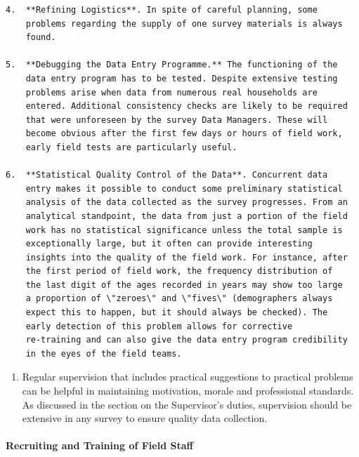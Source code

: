 \documentclass[
]{article}
\providecommand{\tightlist}{%
  \setlength{\itemsep}{0pt}\setlength{\parskip}{0pt}}
\begin{document}
\begin{verbatim}
4.  **Refining Logistics**. In spite of careful planning, some
    problems regarding the supply of one survey materials is always
    found.

5.  **Debugging the Data Entry Programme.** The functioning of the
    data entry program has to be tested. Despite extensive testing
    problems arise when data from numerous real households are
    entered. Additional consistency checks are likely to be required
    that were unforeseen by the survey Data Managers. These will
    become obvious after the first few days or hours of field work,
    early field tests are particularly useful.

6.  **Statistical Quality Control of the Data**. Concurrent data
    entry makes it possible to conduct some preliminary statistical
    analysis of the data collected as the survey progresses. From an
    analytical standpoint, the data from just a portion of the field
    work has no statistical significance unless the total sample is
    exceptionally large, but it often can provide interesting
    insights into the quality of the field work. For instance, after
    the first period of field work, the frequency distribution of
    the last digit of the ages recorded in years may show too large
    a proportion of \"zeroes\" and \"fives\" (demographers always
    expect this to happen, but it should always be checked). The
    early detection of this problem allows for corrective
    re-training and can also give the data entry program credibility
    in the eyes of the field teams.
\end{verbatim}

\begin{enumerate}
\def\labelenumi{\arabic{enumi}.}
\setcounter{enumi}{332}
\tightlist
\item
  Regular supervision that includes practical suggestions to
  practical problems can be helpful in maintaining motivation, morale
  and professional standards. As discussed in the section on the
  Supervisor's duties, supervision should be extensive in any survey
  to ensure quality data collection.
\end{enumerate}

\hypertarget{recruiting-and-training-of-field-staff-1}{%
\paragraph{Recruiting and Training of Field Staff}\label{recruiting-and-training-of-field-staff-1}}
\end{document}
